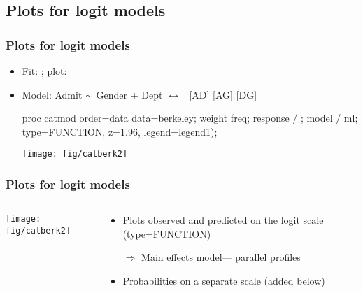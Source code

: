 \subsection{Plots for logit models}
\begin{frame}[fragile]
\frametitle{Plots for logit models}
\begin{itemize}
\item Fit: ; plot: 
\item Model: Admit $\sim$ Gender + Dept $\leftrightarrow$ \loglin\ [AD] [AG] [DG]
\begin{listing}[frame=single,baselinestretch=0.8]
proc catmod order=data data=berkeley;
   weight freq;
   response / ;
   model  / ml;
    type=FUNCTION, z=1.96, legend=legend1);
\end{listing}

\begin{center}
  \texttt{[image: fig/catberk2]}
\end{center}
\end{itemize}
\end{frame}

\begin{frame}
\frametitle{Plots for logit models}
 \begin{columns}
  \begin{column}{.5\textwidth}
     \texttt{[image: fig/catberk2]}
  \end{column}
  \begin{column}{.5\textwidth}
     \begin{itemize}
      \item Plots \alert{observed} and \alert{predicted} on the logit scale (type=FUNCTION)
      \item[$\Rightarrow$] Main effects model--- parallel profiles
      \item Probabilities on a separate scale (added below)
     \end{itemize}
  \end{column}
 \end{columns}
 
\end{frame}

